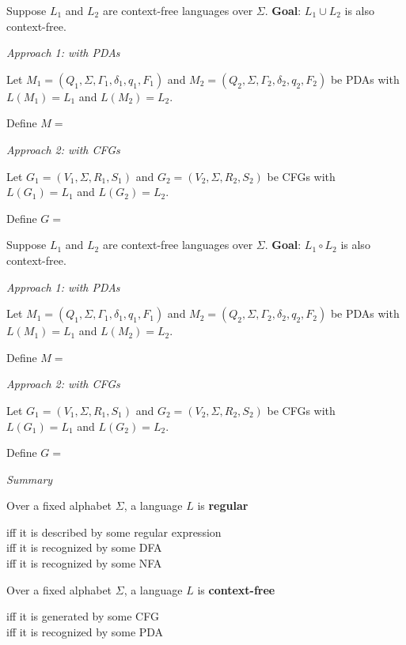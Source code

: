 \documentclass[12pt, oneside]{article}
\begin{document}
\vfill

\newpage
Suppose $L_1$ and $L_2$ are context-free languages over $\Sigma$.  {\bf Goal}:  $L_1 \cup L_2$  is  also context-free.

{\it Approach 1: with  PDAs}

Let $M_1 = ( Q_1, \Sigma, \Gamma_1, \delta_1, q_1, F_1)$ and
$M_2 = ( Q_2, \Sigma, \Gamma_2, \delta_2, q_2, F_2)$ be PDAs with 
$L(M_1) =  L_1$  and  $L(M_2) = L_2$.

Define $M = $

\vfill

{\it Approach  2: with CFGs}

Let $G_1 = (V_1, \Sigma, R_1, S_1)$  and   $G_2 = (V_2, \Sigma, R_2, S_2)$  be CFGs  with
$L(G_1) =  L_1$  and  $L(G_2) = L_2$.

Define $G = $

\vfill

\newpage
Suppose $L_1$ and $L_2$ are context-free languages over $\Sigma$.  {\bf Goal}:  $L_1 \circ L_2$  is  also context-free.


{\it Approach 1: with  PDAs}

Let $M_1 = ( Q_1, \Sigma, \Gamma_1, \delta_1, q_1, F_1)$ and
$M_2 = ( Q_2, \Sigma, \Gamma_2, \delta_2, q_2, F_2)$ be PDAs with 
$L(M_1) =  L_1$  and  $L(M_2) = L_2$.

Define $M = $

\vfill

{\it Approach  2: with CFGs}

Let $G_1 = (V_1, \Sigma, R_1, S_1)$  and   $G_2 = (V_2, \Sigma, R_2, S_2)$  be CFGs  with
$L(G_1) =  L_1$  and  $L(G_2) = L_2$.

Define $G = $

\vfill

{\it Summary}

Over a fixed alphabet $\Sigma$, a language $L$ is {\bf regular}

\vspace{-20pt}
\begin{center}
    iff it is described by some regular expression \\
    iff it is recognized by some DFA\\
    iff it is recognized by some NFA
\end{center}

Over a fixed alphabet $\Sigma$, a language $L$ is {\bf context-free}

\vspace{-20pt}
\begin{center}
    iff it is generated by some CFG\\
    iff it is recognized by some PDA
\end{center}
\end{document}
